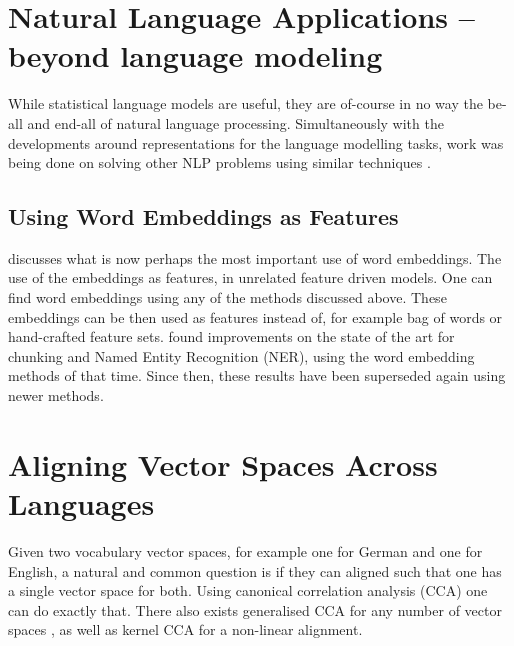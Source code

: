 \documentclass[parskip]{komatufte}
\begin{document}
\section{Natural Language Applications -- beyond language modeling}
While statistical language models are useful, they are of-course in no way the be-all and end-all of natural language processing.
Simultaneously with the developments around representations for the language modelling tasks, work was being done on solving other NLP problems using similar techniques .


\subsection{Using Word Embeddings as Features}


 discusses what is now perhaps the most important use of word embeddings.
The use of the embeddings as features, in unrelated feature driven models.
One can find word embeddings using any of the methods discussed above.
These embeddings can be then used as features instead of, for example bag of words or hand-crafted feature sets.
\textcite{turian2010word} found improvements on the state of the art for chunking and Named Entity Recognition (NER), using the word embedding methods of that time.
Since then, these results have been superseded again using newer methods.


\section{Aligning Vector Spaces Across Languages}\label{sec:aligning-vector-spaces-across-languages}
Given two vocabulary vector spaces, for example one for German and one for English,
a natural and common question is if they can aligned such that one has a single vector space for both.
Using canonical correlation analysis (CCA) one can do exactly that.
There also exists generalised CCA for any number of vector spaces ,
as well as kernel CCA for a non-linear alignment.
\end{document}
